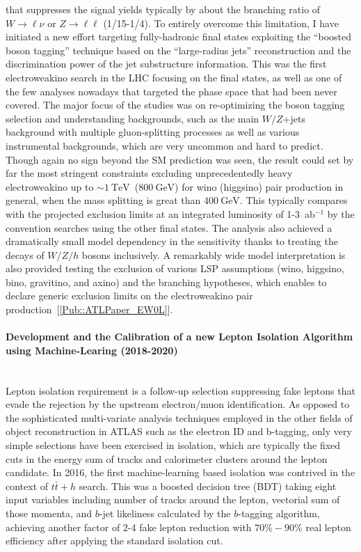 \documentclass[12pt]{article}
\newcommand{\Subsubsection}[1]{\subsubsection*{#1}
\addcontentsline{toc}{subsubsection}{#1}}
\newcommand{\ra}{\rightarrow}
\newcommand{\GeV}{\text{GeV}\xspace}
\newcommand{\TeV}{\text{TeV}\xspace}
\begin{document}
that suppresses the signal yields typically by about the branching ratio of $W \ra \ell\nu$ or $Z \ra \ell\ell$ (1/15-1/4).
To entirely overcome this limitation, I have initiated a new effort targeting fully-hadronic final states exploiting the ``boosted boson tagging'' technique based on the ``large-radius jets'' reconstruction and the discrimination power of the jet substructure information. %
This was the first electroweakino search in the LHC focusing on the final states, as well as one of the few analyses nowadays that targeted the phase space that had been never covered.
The major focus of the studies was on re-optimizing the boson tagging selection and understanding backgrounds, such as the main $W/Z$+jets background with multiple gluon-splitting processes as well as various instrumental backgrounds, which are very uncommon and hard to predict.
Though again no sign beyond the SM prediction was seen, the result could set by far the most stringent constraints excluding unprecedentedly heavy electroweakino up to $\sim 1~\TeV$~($800~\GeV$) for wino (higgsino) pair production in general, when the mass splitting is great than $400~\GeV$. 
This typically compares with the projected exclusion limits at an integrated luminosity of 1-3~ab$^{-1}$ by the convention searches using the other final states.
The analysis also achieved a dramatically small model dependency in the sensitivity thanks to treating the decays of $W/Z/h$ bosons inclusively.
A remarkably wide model interpretation is also provided testing the exclusion of various LSP assumptions (wino, higgsino, bino, gravitino, and axino) and the branching hypotheses,
which enables to declare generic exclusion limits on the electroweakino pair production~[\ref{Pub::ATLPaper_EW0L}].

\paragraph{Development and the Calibration of a new Lepton Isolation Algorithm using Machine-Learing (2018-2020)}  \phantom{k} \vspace{3mm} \\
Lepton isolation requirement is a follow-up selection suppressing fake leptons that evade the rejection by the upstream electron/muon identification.
As opposed to the sophisticated multi-variate analysis techniques employed in the other fields of object reconstruction in ATLAS such as the electron ID and b-tagging,
only very simple selections have been exercised in isolation, which are typically the fixed cuts in the energy sum of tracks and calorimeter clusters around the lepton candidate.
In 2016, the first machine-learning based isolation was contrived in the context of $t\bar{t}+h$ search. 
This was a boosted decision tree (BDT) taking eight input variables including number of tracks around the lepton, vectorial sum of those momenta, and $b$-jet likeliness calculated by the $b$-tagging algorithm, 
achieving another factor of 2-4 fake lepton reduction with $70\%-90\%$ real lepton efficiency after applying the standard isolation cut.  \\
\end{document}
